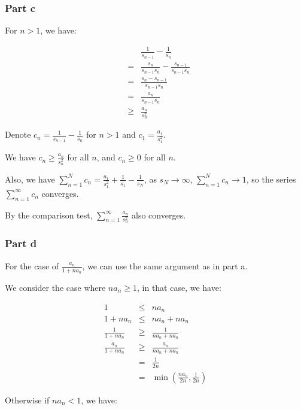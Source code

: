 \subsubsection*{Part c}
For $ n > 1 $, we have:

\begin{eqnarray*}
  &   & \frac{1}{s_{n-1}} - \frac{1}{s_n} \\
  & = & \frac{s_n}{s_{n-1}s_n} - \frac{s_{n-1}}{s_{n-1}s_n} \\
  & = & \frac{s_n - s_{n-1}}{s_{n-1}s_n} \\
  & = & \frac{a_n}{s_{n-1}s_n} \\
  &\ge& \frac{a_n}{s_n^2}
\end{eqnarray*}

Denote $ c_n = \frac{1}{s_{n-1}} - \frac{1}{s_n} $ for $ n > 1 $ and $ c_1 = \frac{a_1}{s_1^2} $.

We have $ c_n \ge \frac{a_n}{s_n^2} $ for all $ n $, and $ c_n \ge 0 $ for all $ n $.

Also, we have $ \sum\limits_{n=1}^{N} c_n = \frac{a_1}{s_1^2} + \frac{1}{s_1} - \frac{1}{s_N} $, as $ s_N \to \infty $, $ \sum\limits_{n=1}^{N} c_n \to 1 $, so the series $ \sum\limits_{n=1}^{\infty} c_n $ converges.

By the comparison test, $ \sum\limits_{n=1}^{\infty} \frac{a_n}{s_n^2} $ also converges.

\subsubsection*{Part d}

For the case of $ \frac{a_n}{1 + na_n} $, we can use the same argument as in part a.

We consider the case where $ na_n \ge 1 $, in that case, we have:

\begin{eqnarray*}
                     1 &\le& na_n \\
              1 + na_n &\le& na_n + na_n \\
    \frac{1}{1 + na_n} &\ge& \frac{1}{na_n + na_n} \\
  \frac{a_n}{1 + na_n} &\ge& \frac{a_n}{na_n + na_n} \\
                       & = & \frac{1}{2n} \\
                       & = & \min(\frac{na_n}{2n}, \frac{1}{2n})
\end{eqnarray*}

Otherwise if $ na_n < 1 $, we have:

